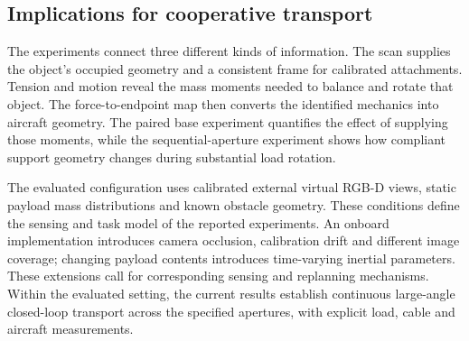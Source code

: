 \subsection{Implications for cooperative transport}
The experiments connect three different kinds of information. The scan supplies the object's occupied geometry and a consistent frame for calibrated attachments. Tension and motion reveal the mass moments needed to balance and rotate that object. The force-to-endpoint map then converts the identified mechanics into aircraft geometry. The paired base experiment quantifies the effect of supplying those moments, while the sequential-aperture experiment shows how compliant support geometry changes during substantial load rotation.

The evaluated configuration uses calibrated external virtual RGB-D views, static payload mass distributions and known obstacle geometry. These conditions define the sensing and task model of the reported experiments. An onboard implementation introduces camera occlusion, calibration drift and different image coverage; changing payload contents introduces time-varying inertial parameters. These extensions call for corresponding sensing and replanning mechanisms. Within the evaluated setting, the current results establish continuous large-angle closed-loop transport across the specified apertures, with explicit load, cable and aircraft measurements.
